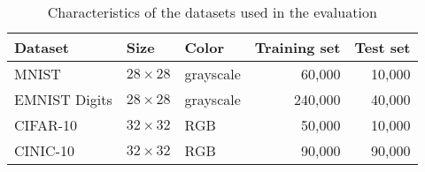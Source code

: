 \begin{table}
\small
    \centering
    \begin{tabular}{|l|l|l|r|r|}
        \hline
        \textbf{Dataset} & \textbf{Size} & \textbf{Color} & \textbf{Training set} & \textbf{Test set} \\
        \hline
        MNIST & $28\times28$ & grayscale & 60,000 & 10,000 \\
        \hline
        EMNIST Digits & $28\times28$ & grayscale & 240,000 & 40,000 \\
        \hline
        CIFAR-10 & $32\times32$ & RGB & 50,000 & 10,000 \\
        \hline
        CINIC-10 & $32\times32$ & RGB & 90,000 & 90,000 \\
        \hline
    \end{tabular}
    \caption{Characteristics of the datasets used in the evaluation}
    \label{tab:datasets}
\end{table}